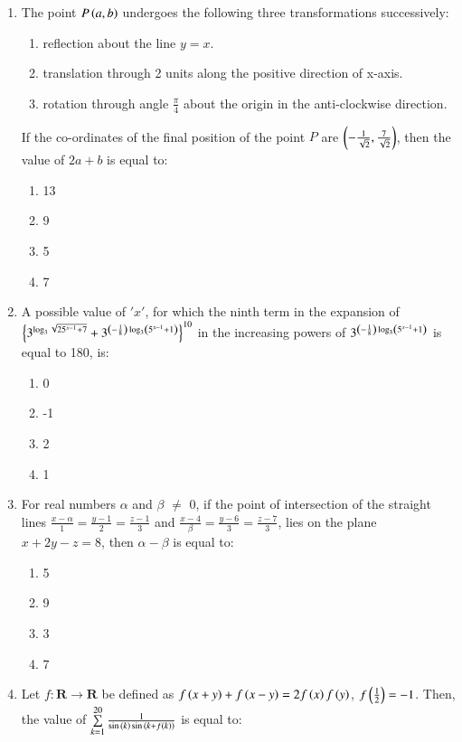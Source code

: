 \documentclass[journal]{IEEEtran}
\begin{document}
\begin{enumerate}
\item The point $P \left(a, b\right)$ undergoes the following three transformations successively:
\begin{enumerate}
    \item reflection about the line $y = x$.
    \item translation through 2 units along the positive direction of x-axis.
    \item rotation through angle $\frac{\pi}{4}$ about the origin in the anti-clockwise direction.
    \end{enumerate}
    If the co-ordinates of the final position of the point $P$ are $\left(-\frac{1}{\sqrt{2}}, \frac{7}{\sqrt{2}}\right)$, then the value of $2a + b$ is equal to:
    \begin{enumerate}
        \item 13
        \item 9
        \item 5
        \item 7 \\
    \end{enumerate}
\item A possible value of $'x'$, for which the ninth term in the expansion of $\left\{3^{\log_{3}\sqrt{25^{x-1}+7}}+3^{\left(-\frac{1}{8}\right)\log_3\left(5^{x-1}+1\right)}\right\}^{10}$ in the increasing powers of $3^{\left(-\frac{1}{8}\right)\log_3\left(5^{x-1}+1\right)}$ is equal to 180, is:
\begin{enumerate}
    \item 0
    \item -1
    \item 2
    \item 1 \\
\end{enumerate}
\item For real numbers $\alpha$ and $\beta$ $\neq$ 0, if the point of intersection of the straight lines $\frac{x - \alpha}{1} = \frac{y - 1}{2} = \frac{z - 1}{3}$ and $\frac{x - 4}{\beta} = \frac{y - 6}{3} = \frac{z - 7}{3}$, lies on the plane $x + 2y - z = 8$, then $\alpha - \beta$ is equal to:
\begin{enumerate}
    \item 5
    \item 9
    \item 3
    \item 7 \\
\end{enumerate}
 \item Let $f:\textbf{R}\rightarrow\textbf{R}$ be defined as $f\left(x+y\right) + f\left(x-y\right) = 2f\left(x\right)f\left(y\right)$, $f\left(\frac{1}{2}\right) = -1$. Then, the value of $\sum\limits_{k=1}^{20}\frac{1}{\sin{\ensuremath{\left(k\right)}}\sin{\ensuremath{\left(k + f\left(k\right)\right)}}}$ is equal to:

\end{enumerate}
\end{document}
